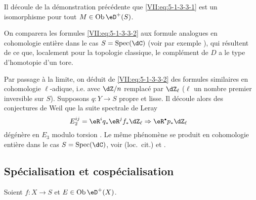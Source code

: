 Il d\'ecoule de la d\'emonstration pr\'ec\'edente que \eqref{VII:eq:5-1-3-3-1} 
est un isomorphisme pour tout $M\in\ob\eD^+(S)$. 

On comparera les formules \eqref{VII:eq:5-1-3-3-2} aux formule analogues en 
cohomologie enti\`ere dans le cas $S=\spec(\dC)$ (voir par exemple 
\cite[3.1]{de71-2}), qui r\'esultent de ce que, localement pour la topologie 
classique, le compl\'ement de $D$ a le type d'homotopie d'un tore. 

Par passage \`a la limite, on d\'eduit de \eqref{VII:eq:5-1-3-3-2} des formules 
similaires en cohomologie $\ell$-adique, i.e. avec $\dZ/n$ remplac\'e par 
$\dZ_\ell$ ($\ell$ un nombre premier inversible sur $S$). Supposons 
$q:Y\to S$ propre et lisse. Il d\'ecoule alors des conjectures de Weil 
\cite{de74,de80} que la suite spectrale de Leray 
\[
  E_2^{i j} = \eR^i q_\ast \eR^j f_\ast \dZ_\ell \Rightarrow \eR^\bullet p_\ast \dZ_\ell 
\]
d\'eg\'en\`ere en $E_3$ modulo torsion \cite[\S 6]{de71-1}. Le m\^eme 
ph\'enom\`ene se produit en cohomologie enti\`ere dans le cas 
$S=\spec(\dC)$, voir (loc.\ cit.) et \cite[3.2.13]{de71-2}. 





\subsection{Sp\'ecialisation et cosp\'ecialisation}\label{VII:5-2}

Soient $f:X\to S$ et $E\in\ob\eD^+(X)$. 





\subsubsection{}\label{VII:5-2-1}

